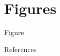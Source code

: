 \documentclass[aspectratio=43]{beamer}
\begin{document}
\section{Figures}



\begin{frame}{Figure}{}
    \begin{center}
    \end{center}
\end{frame}

\begin{frame}[allowframebreaks]{References}
    \printbibliography
\end{frame}


\appendix
\end{document}
